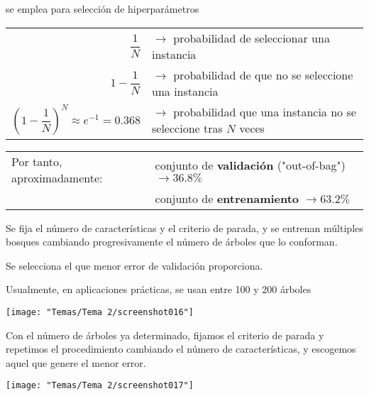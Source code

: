  se emplea para selección de hiperparámetros
\begin{center}
	\begin{tabular}{rl}
		$\dfrac{1}{N}$ & $\to$ probabilidad de seleccionar una instancia\\
		$1-\dfrac{1}{N}$ & $\to$ probabilidad de que no se seleccione una instancia\\
		$\left(1-\dfrac{1}{N}\right)^N\approx e^{-1}=0.368$ & $\to$ probabilidad que una instancia no se seleccione tras $N$ veces
	\end{tabular}
	
	\begin{tabular}{ll}
		Por tanto, aproximadamente: & conjunto de \textbf{validación} ("out-of-bag") $\to 36.8\%$\\
		&conjunto de \textbf{entrenamiento} $\to63.2\%$
	\end{tabular}
\end{center}
\begin{minipage}{0.4\textwidth}
Se fija el número de características y el criterio de parada, y se entrenan múltiples bosques cambiando progresivamente el número de árboles que lo conforman.

Se selecciona el que menor error de validación proporciona.

Usualmente, en aplicaciones prácticas, se usan entre 100 y 200 árboles
\end{minipage}\qquad\begin{minipage}{0.55\textwidth}
\begin{center}
	\texttt{[image: "Temas/Tema 2/screenshot016"]}
\end{center}

\end{minipage}
\begin{minipage}{0.4\textwidth}
	Con el número de árboles ya
	determinado, fijamos el
	criterio de parada y repetimos
	el procedimiento cambiando
	el número de características, y
	escogemos aquel que genere
	el menor error.
\end{minipage}\qquad\begin{minipage}{0.55\textwidth}
\begin{center}
	\texttt{[image: "Temas/Tema 2/screenshot017"]}
\end{center}

\end{minipage}
